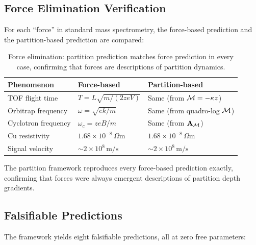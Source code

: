 \subsection{Force Elimination Verification}

For each ``force'' in standard mass spectrometry, the force-based prediction
and the partition-based prediction are compared:

\begin{table}[htbp]
\centering
\caption{Force elimination: partition prediction matches force prediction
  in every case, confirming that forces are descriptions of partition dynamics.}
\label{tab:ch21-force-elim}
\begin{tabular}{@{}lll@{}}
\toprule
\textbf{Phenomenon} & \textbf{Force-based} & \textbf{Partition-based} \\
\midrule
TOF flight time   & $T = L\sqrt{m/(2zeV)}$          & Same (from $\mathcal{M} = -\kappa z$) \\
Orbitrap frequency& $\omega = \sqrt{ek/m}$           & Same (from quadro-log $\mathcal{M}$) \\
Cyclotron frequency& $\omega_c = zeB/m$               & Same (from $\mathbf{A}_{\mathcal{M}}$) \\
Cu resistivity    & $1.68\times 10^{-8}\,\Omega$m    & $1.68\times 10^{-8}\,\Omega$m \\
Signal velocity   & ${\sim}2\times 10^8\,\mathrm{m/s}$ & ${\sim}2\times 10^8\,\mathrm{m/s}$ \\
\bottomrule
\end{tabular}
\end{table}

The partition framework reproduces every force-based prediction exactly,
confirming that forces were always emergent descriptions of partition depth
gradients.

\subsection{Falsifiable Predictions}

The framework yields eight falsifiable predictions, all at zero free parameters:

